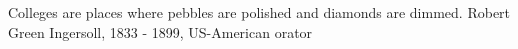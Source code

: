 {Colleges are places where pebbles are polished and diamonds are dimmed.}
{Robert Green Ingersoll, 1833 - 1899, US-American orator}






\newpage


